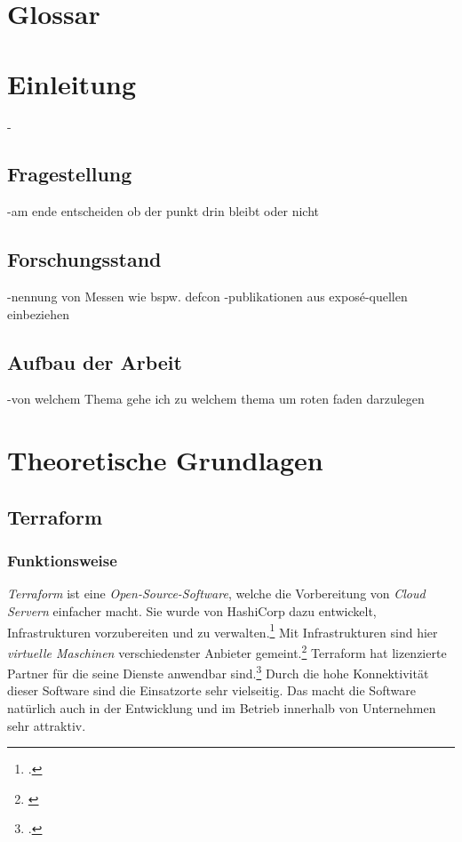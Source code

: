 \documentclass[12pt,oneside]{article}
\begin{document}
\section*{Glossar} 
\begin{acronym}
\end{acronym}
\clearpage
{}  
    \setcounter{page}{1}
\lhead{\nouppercase{\leftmark}}

\section{Einleitung} 
-
\subsection{Fragestellung}
-am ende entscheiden ob der punkt drin bleibt oder nicht
\subsection{Forschungsstand}
-nennung von Messen wie bspw. defcon
\newline
-publikationen aus exposé-quellen einbeziehen
\subsection{Aufbau der Arbeit}
-von welchem Thema gehe ich zu welchem thema um roten faden darzulegen
\newpage

\section{Theoretische Grundlagen} 
\subsection{Terraform}
\subsubsection{Funktionsweise}
\textit{Terraform} ist eine \textit{Open-Source-Software}, welche die Vorbereitung von \textit{Cloud Servern} einfacher macht. Sie wurde von HashiCorp dazu entwickelt, Infrastrukturen vorzubereiten und zu verwalten.\footcite{introform} Mit Infrastrukturen sind hier \textit{virtuelle Maschinen} verschiedenster Anbieter gemeint.\footnote{\cite{Terraform}} Terraform hat lizenzierte Partner für die seine Dienste anwendbar sind.\footcite{TerraProviders} Durch die hohe Konnektivität dieser Software sind die Einsatzorte sehr vielseitig. Das macht die Software natürlich auch in der Entwicklung und im Betrieb innerhalb von Unternehmen sehr attraktiv. 
\end{document}
